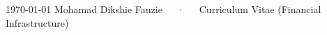 \documentclass[11pt, a4paper]{awesome-cv}
\begin{document}
\makecvheader[C]

\makecvfooter
  {\today}
  {Mohamad Dikshie Fauzie~~~·~~~Curriculum Vitae (Financial Infrastructure)}
  {\thepage}





\newpage





\end{document}
